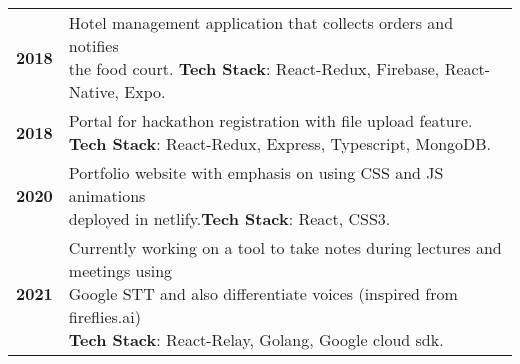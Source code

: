 \documentclass[]{deedy-resume-openfont}
\begin{document}
\begin{minipage}[t]{0.74\textwidth}
\begin{tabular}{cl}
\textbf{2018} & \makecell[l]{Hotel management application that collects orders and notifies\\
the food court. \small{\textbf{Tech Stack}: React-Redux, Firebase, React-Native, Expo.}}\\

\textbf{2018} & \makecell[l]{Portal for hackathon registration with file upload feature.\\
\small{\textbf{Tech Stack}: React-Redux, Express, Typescript, MongoDB.}}\\

\textbf{2020} & \makecell[l]{Portfolio website with emphasis on using CSS and JS animations\\
deployed in netlify.\small{\textbf{Tech Stack}: React, CSS3.}}\\

\textbf{2021} & \makecell[l]{Currently working on a tool to take notes during lectures and meetings using\\ Google STT and also differentiate voices (inspired from fireflies.ai)\\ \small{\textbf{Tech Stack}: React-Relay, Golang, Google cloud sdk.}}\\
\end{tabular}

\sectionsep
\nocite{*}

\end{minipage} 
\end{document}
